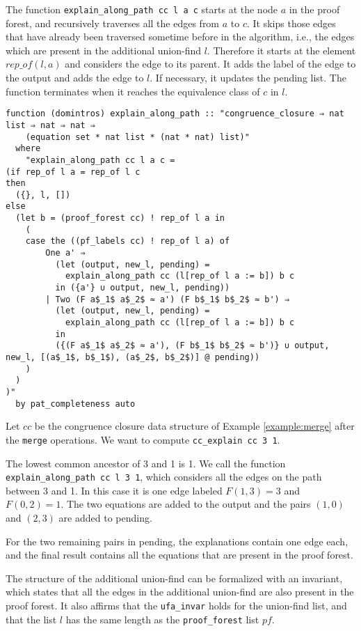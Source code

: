 The function \lstinline{explain_along_path cc l a c} starts at the node $a$ in the proof forest, and recursively traverses all the edges from $a$ to $c$. It skips those edges that have already been traversed sometime before in the algorithm, i.e., the edges which are present in the additional union-find $l$. Therefore it starts at the element $rep\_of(l, a)$ and considers the edge to its parent. It adds the label of the edge to the output and adds the edge to $l$. If necessary, it updates the pending list. The function terminates when it reaches the equivalence class of $c$ in $l$.

\begin{lstlisting}
function (domintros) explain_along_path :: "congruence_closure ⇒ nat list ⇒ nat ⇒ nat ⇒
    (equation set * nat list * (nat * nat) list)"
  where
    "explain_along_path cc l a c =
(if rep_of l a = rep_of l c
then
  ({}, l, [])
else
  (let b = (proof_forest cc) ! rep_of l a in
    (
    case the ((pf_labels cc) ! rep_of l a) of
        One a' ⇒
          (let (output, new_l, pending) =
            explain_along_path cc (l[rep_of l a := b]) b c
          in ({a'} ∪ output, new_l, pending))
        | Two (F a$_1$ a$_2$ ≈ a') (F b$_1$ b$_2$ ≈ b') ⇒
          (let (output, new_l, pending) =
            explain_along_path cc (l[rep_of l a := b]) b c
          in
          ({(F a$_1$ a$_2$ ≈ a'), (F b$_1$ b$_2$ ≈ b')} ∪ output, new_l, [(a$_1$, b$_1$), (a$_2$, b$_2$)] @ pending))
    )
  )
)"
  by pat_completeness auto
\end{lstlisting}

\begin{exmp}
Let $cc$ be the congruence closure data structure of Example \ref{example:merge} after the \lstinline|merge| operations. We want to compute \lstinline|cc_explain cc 3 1|.

The lowest common ancestor of 3 and 1 is 1. We call the function \lstinline{explain_along_path cc l 3 1}, which considers all the edges on the path between 3 and 1. In this case it is one edge labeled $F (1,3) = 3$ and $F(0,2) = 1$. The two equations are added to the output and the pairs $(1,0)$ and $(2,3)$ are added to pending.

For the two remaining pairs in pending, the explanations contain one edge each, and the final result contains all the equations that are present in the proof forest.
\end{exmp}


The structure of the additional union-find can be formalized with an invariant, which states that all the edges in the additional union-find are also present in the proof forest. It also affirms that the \lstinline{ufa_invar} holds for the union-find list, and that the list $l$ has the same length as the \lstinline{proof_forest} list $pf$.

